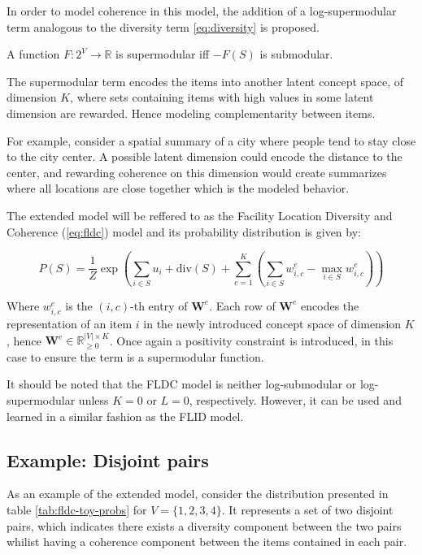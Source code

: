 In order to model coherence in this model, the addition of a log-supermodular term analogous to the diversity term \ref{eq:diversity} is proposed.

\begin{definition}
  \label{def:supermodularity}
  A function $F:2^V \rightarrow \mathbb{R}$ is supermodular iff $-F(S)$ is submodular.
\end{definition}

The supermodular term encodes the items into another latent concept space, of dimension $K$, where sets containing items with high values in some latent dimension are rewarded. Hence modeling complementarity between items.

For example, consider a spatial summary of a city where people tend to stay close to the city center. A possible latent dimension could encode the distance to the center, and rewarding coherence on this dimension would create summarizes where all locations are close together which is the modeled behavior.

The extended model will be reffered to as the Facility Location Diversity and Coherence (\ref{eq:fldc}) model and its probability distribution is given by:

\begin{equation}
  \tag{FLDC}
  P(S) = \frac{1}{Z}\exp{\left(\sum_{i \in S}{u_{i}} + \mathrm{div}(S) + \sum_{c=1}^{K}{\left(\sum_{i \in S}{w^{e}_{i,c}} - \max_{i \in S}{w^{e}_{i,c}}\right)}\right)}
  \label{eq:fldc}
\end{equation}

Where $w^{e}_{i,c}$ is the $(i,c)$-th entry of $\mathbf{W}^{e}$. Each row of $\mathbf{W}^{e}$ encodes the representation of an item $i$ in the newly introduced concept space of dimension $K$, hence $\mathbf{W}^{e} \in \mathbb{R}^{|V|\times K}_{\geq 0}$. Once again a positivity constraint is introduced, in this case to ensure the term is a supermodular function.

It should be noted that the FLDC model is neither log-submodular or log-supermodular unless $K=0$ or $L=0$, respectively. However, it can be used and learned in a similar fashion as the FLID model.

\subsection{Example: Disjoint pairs}
\label{sec:fldc-toy}

As an example of the extended model, consider the distribution presented in table \ref{tab:fldc-toy-probs} for $V = \{1,2,3,4\}$. It represents a set of two disjoint pairs, which indicates there exists a diversity component between the two pairs whilist having a coherence component between the items contained in each pair.

